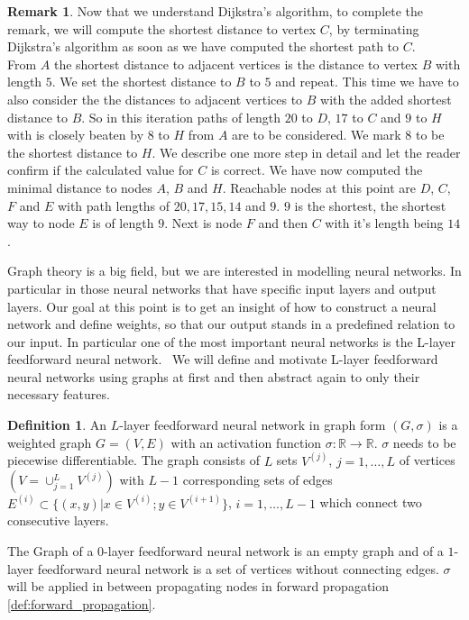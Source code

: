 \documentclass{article}
\theoremstyle{definition}
\newtheorem{definition}[theorem]{Definition}
\newtheorem{remark}[theorem]{Remark}
\begin{document}
\begin{remark}
Now that we understand Dijkstra's algorithm, to complete the remark, we will compute the shortest distance to vertex $C$, by terminating Dijkstra's algorithm as soon as we have computed the shortest path to $C$. \\
From $A$ the shortest distance to adjacent vertices is the distance to vertex $B$ with length $5$. We set the shortest distance to $B$ to $5$ and repeat. This time we have to also consider the the distances to adjacent vertices to $B$ with the added shortest distance to $B$. So in this iteration paths of length $20$ to $D$, $17$ to $C$ and $9$ to $H$ with is closely beaten by $8$ to $H$ from $A$ are to be considered. We mark $8$ to be the shortest distance to $H$. We describe one more step in detail and let the reader confirm if the calculated value for $C$ is correct. We have now computed the minimal distance to nodes $A$, $B$ and $H$. Reachable nodes at this point are $D$, $C$, $F$ and $E$ with path lengths of $20, 17, 15, 14$ and $9$. $9$ is the shortest, the shortest way to node $E$ is of length $9$. Next is node $F$ and then $C$ with it's length being $14$.

\end{remark}

Graph theory is a big field, but we are interested in modelling neural networks. In particular in those neural networks that have specific input layers and output layers. Our goal at this point is to get an insight of how to construct a neural network and define weights, so that our output stands in a predefined relation to our input.
In particular one of the most important neural networks is the L-layer feedforward neural network. \
We will define and motivate L-layer feedforward neural networks using graphs at first and then abstract again to only their necessary features.

\begin{definition}
An $L$-layer feedforward neural network in graph form $(G, \sigma)$ is a weighted graph $G=(V, E)$ with an activation function $\sigma: \mathbb{R} \to \mathbb{R}$. $\sigma$ needs to be piecewise differentiable. The graph consists of $L$ sets $V^{(j)}$, $j = 1, \dots , L$ of vertices $(V=\cup_{j=1}^{L}V^{(j)})$ with $L-1$ corresponding sets of edges $E^{(i)} \subset \{(x,y)|x \in V^{(i)}; y \in V^{(i+1)}\}$, $i = 1, \dots , L-1$ which connect two consecutive layers.
\end{definition}

The Graph of a $0$-layer feedforward neural network is an empty graph and of a $1$-layer feedforward neural network is a set of vertices without connecting edges. $\sigma$ will be applied in between propagating nodes in forward propagation \ref{def:forward_propagation}.
\end{document}
